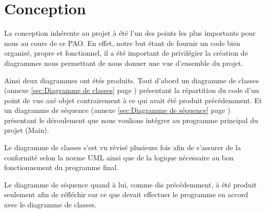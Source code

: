 \section{Conception}
\label{sec:Conception}

\par La conception inhérente au projet à été l'un des points les plus importants pour nous au cours de ce PAO. En effet, notre but étant de fournir un code bien organisé, propre et fonctionnel, il a été important de privilégier la création de diagrammes nous permettant de nous donner une vue d'ensemble du projet.
\par Ainsi deux diagrammes ont étés produits. Tout d'abord un diagramme de classes (annexe \ref{sec:Diagramme de classes} page \pageref{sec:Diagramme de classes}) présentant la répartition du code d'un point de vue axé objet contrairement à ce qui avait été produit précédemment. Et un diagramme de séquence (annexe \ref{sec:Diagramme de séquence} page \pageref{sec:Diagramme de séquence}) présentant le déroulement que nous voulions intégrer au programme principal du projet (Main).
\par Le diagramme de classes s'est vu révisé plusieurs fois afin de s'assurer de la conformité selon la norme UML ainsi que de la logique nécessaire au bon fonctionnement du programme final.
\par Le diagramme de séquence quand à lui, comme dis précédemment, à été produit seulement afin de réfléchir sur ce que devait effectuer le programme en accord avec le diagramme de classes.

